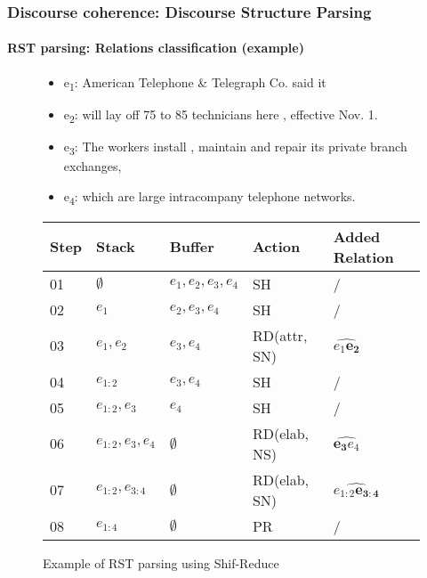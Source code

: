 \documentclass[xcolor=table]{beamer}
\begin{document}
\begin{frame}
	\frametitle{Discourse coherence: Discourse Structure Parsing}
	\framesubtitle{RST parsing: Relations classification (example)}
	
	\begin{figure}
		\begin{minipage}{0.25\textwidth}
		\end{minipage}
		\begin{minipage}{0.70\textwidth}
			\scriptsize
			\begin{itemize}
				\item e\textsubscript{1}: American Telephone \& Telegraph Co. said it
				\item e\textsubscript{2}: will lay off 75 to 85 technicians here , effective Nov. 1.
				\item e\textsubscript{3}: The workers install , maintain and repair its private branch exchanges,
				\item e\textsubscript{4}: which are large intracompany telephone networks.
			\end{itemize}
		\end{minipage}
		
		\small
		\begin{tabular}{lllll}
			\hline\hline 
			Step & Stack & Buffer & Action & Added Relation \\
			\hline
			01 & $\emptyset$ & $e_1, e_2, e_3, e_4$ & SH & / \\
			02 & $e_1$ & $e_2, e_3, e_4$ & SH & / \\
			03 & $e_1, e_2$ & $e_3, e_4$ & RD(attr, SN) & $\widehat{e_1 \mathbf{e_2}}$ \\
			04 & $e_{1:2}$ & $e_3, e_4$ & SH & / \\
			05 & $e_{1:2}, e_3$ & $e_4$ & SH & / \\
			06 & $e_{1:2}, e_3, e_4$ & $\emptyset$ & RD(elab, NS) & $\widehat{\mathbf{e_3} e_4}$ \\
			07 & $e_{1:2}, e_{3:4}$ & $\emptyset$ & RD(elab, SN) & $\widehat{e_{1:2}\mathbf{e_{3:4}}}$ \\
			08 & $e_{1:4}$ & $\emptyset$ & PR & / \\
			\hline\hline
		\end{tabular}
		\caption{Example of RST parsing using Shif-Reduce \cite{2018-yu-al}}
	\end{figure}
	
\end{frame}
\end{document}
